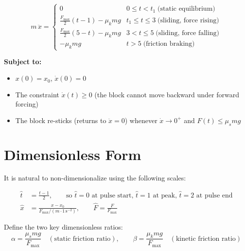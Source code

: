 \documentclass[11pt]{article}
\begin{document}
\begin{tcolorbox}[colback=red!5, colframe=red!50!black, title=Complete Equation of Motion]
\begin{equation}
\boxed{
m\,\ddot{x} =
\begin{cases}
0 & 0 \le t < t_1 \;\text{(static equilibrium)} \\[6pt]
\displaystyle \frac{F_{\max}}{2}(t-1) - \mu_k m g & t_1 \le t \le 3 \;\text{(sliding, force rising)} \\[8pt]
\displaystyle \frac{F_{\max}}{2}(5-t) - \mu_k m g & 3 < t \le 5 \;\text{(sliding, force falling)} \\[8pt]
-\mu_k m g & t > 5 \;\text{(friction braking)}
\end{cases}
}
\label{eq:master}
\end{equation}

\medskip
\noindent
\textbf{Subject to:}
\begin{itemize}
    \item $x(0) = x_0$, \;$\dot{x}(0) = 0$
    \item The constraint $\dot{x}(t) \ge 0$ \;(the block cannot move backward under forward forcing)
    \item The block re-sticks (returns to $\ddot{x} = 0$) whenever $\dot{x} \to 0^+$ and $F(t) \le \mu_s mg$
\end{itemize}
\end{tcolorbox}

\section{Dimensionless Form}

\noindent
It is natural to non-dimensionalize using the following scales:

\begin{align}
\hat{t} &= \frac{t - 1}{2}, \qquad \text{so } \hat{t} = 0 \text{ at pulse start, } \hat{t} = 1 \text{ at peak, } \hat{t} = 2 \text{ at pulse end} \\[6pt]
\hat{x} &= \frac{x - x_0}{F_{\max}/(m \cdot 1\,\text{s}^{-2})}, \qquad \hat{F} = \frac{F}{F_{\max}}
\end{align}

\noindent
Define the two key dimensionless ratios:
\begin{equation}
\boxed{
\alpha = \frac{\mu_s m g}{F_{\max}} \quad (\text{static friction ratio}),
\qquad
\beta = \frac{\mu_k m g}{F_{\max}} \quad (\text{kinetic friction ratio})
}
\label{eq:dimless_params}
\end{equation}
\end{document}
